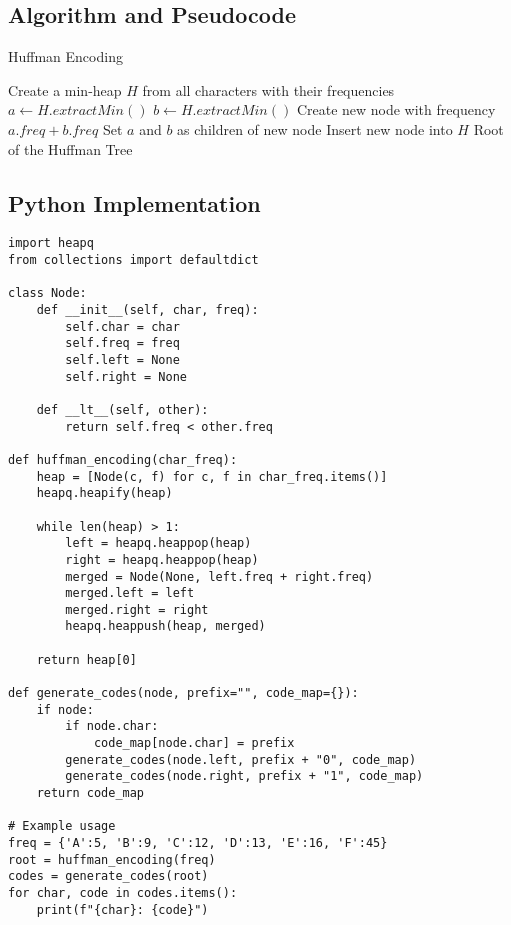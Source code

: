 \documentclass[14pt]{extarticle}
\begin{document}
\newpage
\subsection{Algorithm and Pseudocode}
\begin{algorithm}[H]
\caption{Huffman Encoding}
\begin{algorithmic}[1]
    \State Create a min-heap $H$ from all characters with their frequencies
        \State $a \gets H.extractMin()$
        \State $b \gets H.extractMin()$
        \State Create new node with frequency $a.freq + b.freq$
        \State Set $a$ and $b$ as children of new node
        \State Insert new node into $H$
    \EndWhile
    \State \Return Root of the Huffman Tree
\EndProcedure
\end{algorithmic}
\end{algorithm}

\newpage
\subsection{Python Implementation}
\begin{lstlisting}[style=python, caption={Huffman Encoding in Python}]
import heapq
from collections import defaultdict

class Node:
    def __init__(self, char, freq):
        self.char = char
        self.freq = freq
        self.left = None
        self.right = None

    def __lt__(self, other):
        return self.freq < other.freq

def huffman_encoding(char_freq):
    heap = [Node(c, f) for c, f in char_freq.items()]
    heapq.heapify(heap)

    while len(heap) > 1:
        left = heapq.heappop(heap)
        right = heapq.heappop(heap)
        merged = Node(None, left.freq + right.freq)
        merged.left = left
        merged.right = right
        heapq.heappush(heap, merged)

    return heap[0]

def generate_codes(node, prefix="", code_map={}):
    if node:
        if node.char:
            code_map[node.char] = prefix
        generate_codes(node.left, prefix + "0", code_map)
        generate_codes(node.right, prefix + "1", code_map)
    return code_map

# Example usage
freq = {'A':5, 'B':9, 'C':12, 'D':13, 'E':16, 'F':45}
root = huffman_encoding(freq)
codes = generate_codes(root)
for char, code in codes.items():
    print(f"{char}: {code}")
\end{lstlisting}
\end{document}
